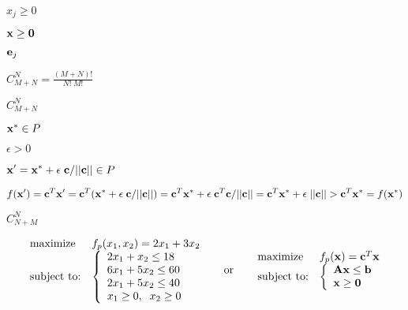 \documentclass{article}
\def\lthtmlcheckvsize{\ifdim\ht\sizebox<\vsize 
  \ifdim\wd\sizebox<\hsize\expandafter\hfill\fi \expandafter\vfill
  \else\expandafter\vss\fi}%
\begin{document}
{\newpage\clearpage
{}%
$ x_j\ge 0$%
\lthtmlindisplaymathZ
\lthtmlcheckvsize\clearpage}

{\newpage\clearpage
{}%
$ {\bf x}\ge{\bf0}$%
\lthtmlindisplaymathZ
\lthtmlcheckvsize\clearpage}

{\newpage\clearpage
{}%
$ {\bf e}_j$%
\lthtmlindisplaymathZ
\lthtmlcheckvsize\clearpage}

{\newpage\clearpage
{}%
$\displaystyle C_{M+N}^N=\frac{(M+N)!}{N!\;M!}$%
\lthtmlindisplaymathZ
\lthtmlcheckvsize\clearpage}

{\newpage\clearpage
{}%
$ C_{M+N}^N$%
\lthtmlindisplaymathZ
\lthtmlcheckvsize\clearpage}

{\newpage\clearpage
{}%
$ {\bf x}^*\in P$%
\lthtmlindisplaymathZ
\lthtmlcheckvsize\clearpage}

{\newpage\clearpage
{}%
$ \epsilon>0$%
\lthtmlindisplaymathZ
\lthtmlcheckvsize\clearpage}

{\newpage\clearpage
{}%
$\displaystyle {\bf x}'={\bf x}^*+\epsilon\;{\bf c}/||{\bf c}||\in P$%
\lthtmlindisplaymathZ
\lthtmlcheckvsize\clearpage}

{\newpage\clearpage
{}%
$\displaystyle f({\bf x}')={\bf c}^T{\bf x}'
={\bf c}^T({\bf x}^*+\epsilon\;{\bf c}/||{\bf c}||)
={\bf c}^T{\bf x}^*+\epsilon\;{\bf c}^T{\bf c}/||{\bf c}||
={\bf c}^T{\bf x}^*+\epsilon\;||{\bf c}||>{\bf c}^T{\bf x}^*=f({\bf x}^*)$%
\lthtmlindisplaymathZ
\lthtmlcheckvsize\clearpage}

{\newpage\clearpage
{}%
$ C_{N+M}^N$%
\lthtmlindisplaymathZ
\lthtmlcheckvsize\clearpage}

{\newpage\clearpage
{}%
\begin{displaymath}\begin{array}{ll}
\mbox{maximize}    & f_p(x_1,x_2)=2x_1+3x_2 \\
\mbox{subject to:} &
\left\{ \begin{array}{l}
2x_1+ x_2 \le 18\\6x_1+5x_2 \le 60 \\2x_1+5x_2 \le 40 \\x_1 \ge 0,\;\; x_2\ge 0
\end{array}\right.
\end{array}
\;\;\;\;\;\;\mbox{or}\;\;\;\;\;\;
\begin{array}{ll}
\mbox{maximize}    & f_p({\bf x})={\bf c}^T{\bf x} \\
\mbox{subject to:} &
\left\{ \begin{array}{l}{\bf A}{\bf x}\le{\bf b}\\{\bf x}\ge {\bf0}
\end{array}\right.
\end{array}\end{displaymath}%
\lthtmldisplayZ
\lthtmlcheckvsize\clearpage}
\end{document}
